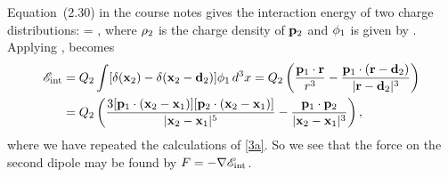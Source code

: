 \begin{solution}
	Equation~(2.30) in the course notes gives the interaction energy of two charge distributions:
	\beqn \label{Eint}
		\sEint = \int \rhow \phiq \dcx,
	\eeqn
	where $\rho_2$ is the charge density of $\mathbf{p}_2$ and $\phi_1$ is given by .  Applying ,  becomes
	\begin{align*}
		\mathscr{E}_\text{int} &= Q_2 \int [\delta(\mathbf{x}_2) - \delta(\mathbf{x}_2 - \mathbf{d}_2)] \phi_1 \dd[3]{x}
		= Q_2 \left( \frac{\mathbf{p}_1 \cdot \mathbf{r}}{r^3} - \frac{\mathbf{p}_1 \cdot (\mathbf{r} - \mathbf{d}_2)}{|\mathbf{r} - \mathbf{d}_2|^3} \right) \\
		&= Q_2 \left( \frac{3[\mathbf{p}_1 \cdot (\mathbf{x}_2 - \mathbf{x}_1)][\mathbf{p}_2 \cdot (\mathbf{x}_2 - \mathbf{x}_1)]}{|\mathbf{x}_2 - \mathbf{x}_1|^5} - \frac{\mathbf{p}_1 \cdot \mathbf{p}_2}{|\mathbf{x}_2 - \mathbf{x}_1|^3} \right),
	\end{align*}
	where we have repeated the calculations of \ref{3a}.  So we see that the force on the second dipole may be found by $F = -\nabla \mathscr{E}_\text{int}$.
\end{solution}